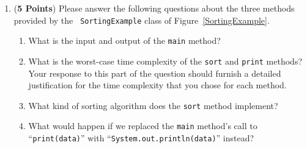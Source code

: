 \documentclass[12pt]{article}
\begin{document}
\begin{enumerate}
\begin{enumerate}


\item ({\bf 5 Points}) Please answer the following questions about the three methods provided by the {\tt
SortingExample} class of Figure~\ref{SortingExample}.

  \begin{enumerate}

  \item What is the input and output of the {\tt main} method?

  \item What is the worst-case time complexity of the {\tt sort} and
    {\tt print} methods?  Your response to this part of the question
    should furnish a detailed justification for the time complexity
    that you chose for each method.

  \item What kind of sorting algorithm does the {\tt sort} method
    implement?

    \item \begin{sloppypar}
      What would happen if we replaced the {\tt main} method's call to ``{\tt print(data)}'' with
      ``{\tt System.out.println(data)}'' instead?
    \end{sloppypar}

  \end{enumerate}



\end{enumerate}
\end{enumerate}
\end{document}
